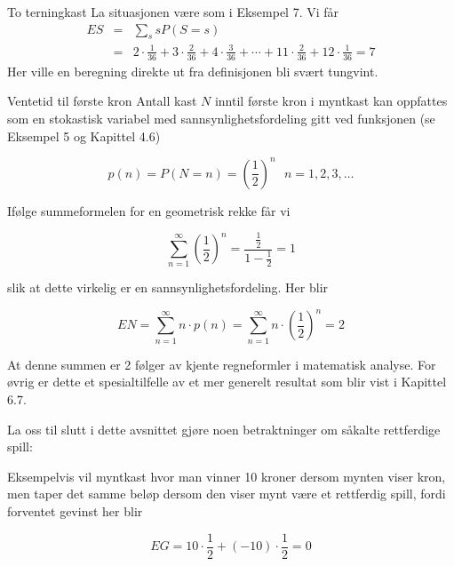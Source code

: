 \begin{eksempel}{To terningkast}
La situasjonen være som i Eksempel 7. Vi får
\begin{eqnarray*}
 ES&=&\sum_{s} sP(S=s) \\
   &=&2 \cdot \frac{1}{36}+3 \cdot \frac{2}{36}+4 \cdot \frac{3}{36}+
                   \cdots + 11 \cdot \frac{2}{36}+12 \cdot \frac{1}{36}=7
\end{eqnarray*}
\noindent Her ville en beregning direkte ut fra definisjonen bli svært
tungvint.
\end{eksempel}

\begin{eksempel}{Ventetid til første kron}
Antall kast $N$ inntil første kron i myntkast kan oppfattes som
en stokastisk variabel med sannsynlighetsfordeling gitt ved funksjonen
(se Eksempel 5 og Kapittel 4.6)

\[ p(n)=P(N=n)={(\frac{1}{2})}^n \mbox{\ \ } n=1,2,3,\ldots \]

\noindent Ifølge summeformelen for en geometrisk rekke får vi

\[   \sum_{n=1}^{\infty}{(\frac{1}{2})}^n=
                        \frac{\frac{1}{2}}{1-\frac{1}{2}}=1 \]

\noindent slik at dette virkelig er en sannsynlighetsfordeling. Her blir

\[   EN=\sum_{n=1}^{\infty}n \cdot p(n)=
                    \sum_{n=1}^{\infty}n \cdot {(\frac{1}{2})}^n=2 \]

\noindent At denne summen er 2 følger av kjente regneformler i matematisk
analyse. For øvrig er dette et spesialtilfelle av et mer generelt
resultat som blir vist i Kapittel 6.7.
\end{eksempel}

La oss til slutt i dette avsnittet gjøre noen betraktninger om
såkalte rett\-ferdige spill:

\begin{center}  \end{center}
Eksempelvis vil myntkast hvor man vinner 10 kroner dersom mynten
viser kron, men taper det samme beløp dersom den viser mynt være
et rettferdig spill, fordi forventet gevinst her blir

\[ EG=10 \cdot \frac{1}{2}+(-10) \cdot \frac{1}{2}=0 \]

